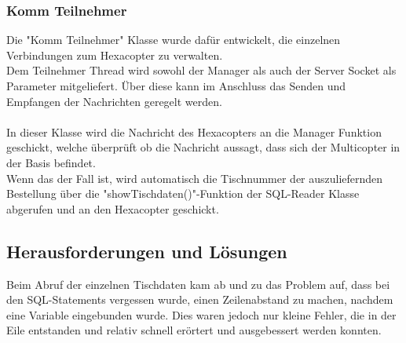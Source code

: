 \subsubsection*{Komm Teilnehmer}
Die "Komm Teilnehmer" Klasse wurde dafür entwickelt, die einzelnen Verbindungen zum Hexacopter zu verwalten.
\\
Dem Teilnehmer Thread wird sowohl der Manager als auch der Server Socket als Parameter mitgeliefert. Über diese kann im Anschluss das Senden und Empfangen der Nachrichten geregelt werden.
\\ \\
In dieser Klasse wird die Nachricht des Hexacopters an die Manager Funktion geschickt, welche überprüft ob die Nachricht aussagt, dass sich der Multicopter in der Basis befindet.
\\
Wenn das der Fall ist, wird automatisch die Tischnummer der auszuliefernden Bestellung über die "showTischdaten()"-Funktion der SQL-Reader Klasse abgerufen und an den Hexacopter geschickt.

  \subsection{Herausforderungen und Lösungen}
Beim Abruf der einzelnen Tischdaten kam ab und zu das Problem auf, dass bei den SQL-Statements vergessen wurde, einen Zeilenabstand zu machen, nachdem eine Variable eingebunden wurde. Dies waren jedoch nur kleine Fehler, die in der Eile entstanden und relativ schnell erörtert und ausgebessert werden konnten.
